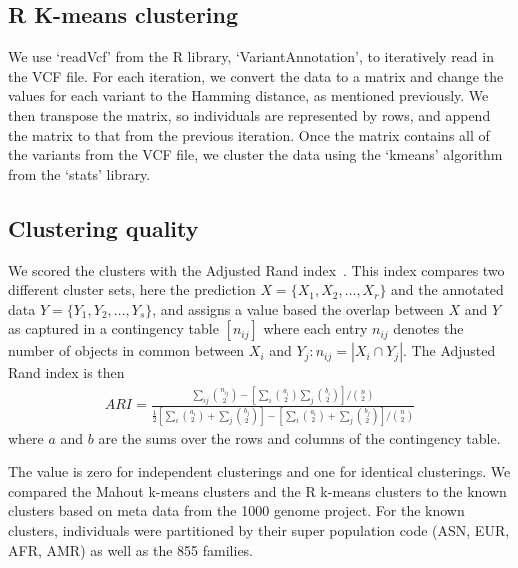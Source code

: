 \documentclass[twocolumn]{bmcart}%
\begin{document}
\subsection*{R K-means clustering}
We use `readVcf' from the R library, `VariantAnnotation', to iteratively read in the VCF file. For each iteration, we convert the data to a matrix and
change the values for each variant to the Hamming distance, as mentioned previously. We then transpose the matrix, so individuals are represented
by rows, and append the matrix to that from the previous iteration. Once the matrix contains all of the variants from the VCF file, we cluster the data
using the `kmeans' algorithm from the `stats' library.



\subsection*{Clustering quality}
We scored the clusters with the Adjusted Rand index~\cite{Hubert1985}. 
This index compares two different cluster sets, here the prediction $X = \{ X_1, X_2, \ldots , X_r \}$ and the annotated data $Y = \{ Y_1, Y_2, \ldots , Y_s \}$, and assigns a value based the overlap between $X$ and $Y$ as captured in a contingency table $\left[n_{ij}\right]$ where each entry $n_{ij}$ denotes the number of objects in common between $X_i$ and $Y_j : n_{ij}=|X_i \cap Y_j|$. 
The Adjusted Rand index is then 
{\tiny
\begin{eqnarray*}
ARI=\frac{\sum_{ij}{{n_{ij}\choose 2}} - \left[ \sum_{i}{{a_i\choose2}} \sum_{j}{{b_i\choose2}} \right] / {n\choose2}}{\frac{1}{2} \left[ \sum_{i}{{a_{i}\choose 2} + \sum_{j}{{b_{j}\choose 2}}} \right] - \left[ \sum_{i}{{a_{i}\choose 2} + \sum_{j}{{b_{j}\choose 2}}} \right] / {n\choose2}} 
\end{eqnarray*}
}
where $a$ and $b$ are the sums over the rows and columns of the contingency table.

The value is zero for independent clusterings and one for identical clusterings. 
We compared the Mahout k-means
clusters and the R k-means clusters to the known clusters based on meta data from the 1000 genome project. For the known clusters,
individuals were partitioned by their super population code (ASN, EUR, AFR, AMR) as well as the 855 families.
\end{document}
